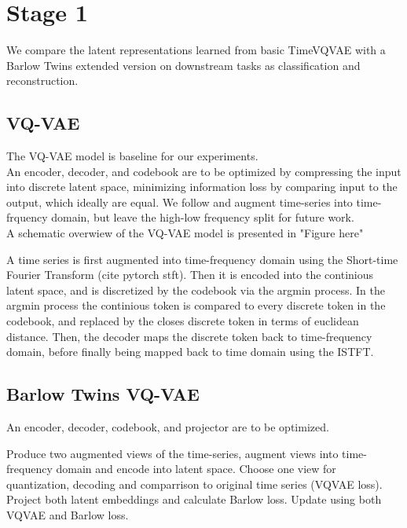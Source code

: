 \documentclass[../../thesis.tex]{subfiles}
\begin{document}

\section{Stage 1}
We compare the latent representations learned from basic TimeVQVAE with a Barlow Twins extended version on downstream tasks as classification and reconstruction.

\subsection{VQ-VAE}
The VQ-VAE model is baseline for our experiments.\\

An encoder, decoder, and codebook are to be optimized by compressing the input into discrete latent space, minimizing information loss by comparing input to the output, which ideally are equal. We follow \cite{TimeVQVAE} and augment time-series into time-frquency domain, but leave the high-low frequency split for future work. \\

A schematic overwiew of the VQ-VAE model is presented in "Figure here"

A time series is first augmented into time-frequency domain using the Short-time Fourier Transform (cite pytorch stft). Then it is encoded into the continious latent space, and is discretized by the codebook via the argmin process. In the argmin process the continious token is compared to every discrete token in the codebook, and replaced by the closes discrete token in terms of euclidean distance. Then, the decoder maps the discrete token back to time-frequency domain, before finally being mapped back to time domain using the ISTFT.

\subsection{Barlow Twins VQ-VAE}

An encoder, decoder, codebook, and projector are to be optimized.

Produce two augmented views of the time-series, augment views into time-frequency domain and encode into latent space. Choose one view for quantization, decoding and comparrison to original time series (VQVAE loss). Project both latent embeddings and calculate Barlow loss. Update using both VQVAE and Barlow loss.
\end{document}
